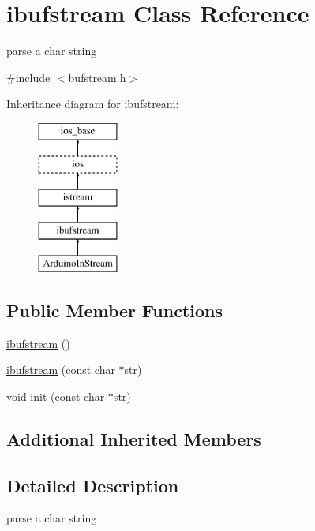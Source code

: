 \hypertarget{classibufstream}{\section{ibufstream Class Reference}
\label{classibufstream}
}


parse a char string  




{\ttfamily \#include $<$bufstream.\-h$>$}

Inheritance diagram for ibufstream\-:\begin{figure}[H]
\begin{center}
\leavevmode
\includegraphics[height=5.000000cm]{classibufstream}
\end{center}
\end{figure}
\subsection*{Public Member Functions}
\begin{DoxyCompactItemize}
\item 
\hyperlink{classibufstream_ac7601268c091120eaea2c30a32d6ba67}{ibufstream} ()
\item 
\hyperlink{classibufstream_ac6a4aa72b5098e36c5960b77c6e54f43}{ibufstream} (const char $\ast$str)
\item 
void \hyperlink{classibufstream_a44f332cbd26470565fd6076f5359ad8c}{init} (const char $\ast$str)
\end{DoxyCompactItemize}
\subsection*{Additional Inherited Members}


\subsection{Detailed Description}
parse a char string 

